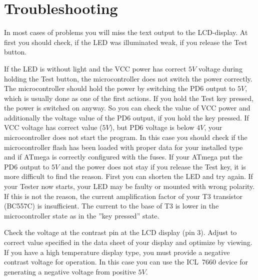 \section{Troubleshooting}
In most cases of problems you will miss the text output to the LCD-display.
At first you should check, if the LED was illuminated weak, if you release
the Test button. 
\begin{description} \setlength{\itemsep}{0em}

\item[Power does not switch on.]
If the LED is without light and the VCC power has correct
\(5V\) voltage during holding the Test button, the microcontroller does not switch the power
correctly. The microcontroller should hold the power by switching the
PD6 output to \(5V\), which is usually done as one of the first actions.
If you hold the Test key pressed, the power is switched on anyway.
So you can check the value of VCC power and additionally the voltage value
of the PD6 output, if you hold the key pressed.
If VCC voltage has correct value (\(5V\)), but PD6 voltage is
below \(4V\), your microcontroller does not start the program. In this case
you should check if the microcontroller flash has been loaded with proper data for your
installed type and if ATmega is correctly configured with the fuses.
If your ATmega put the PD6 output to \(5V\) and the power does not stay if you
release the Test key, it is more difficult to find the reason.
First you can shorten the LED and try again. If your Tester now starts,
your LED may be faulty or mounted with wrong polarity. If this is not
the reason, the current amplification factor of your T3 transistor (BC557C)
is insufficient. The current to the base of T3 is lower in the microcontroller
state as in the ''key pressed'' state.

\item[Nothing is readable on the LCD display]
Check the voltage at the contrast pin at the LCD display (pin 3). Adjust to
correct value specified in the data sheet of your display and optimize by viewing.
If you have a high temperature display type, you must provide a negative contrast voltage
for operation. In this case you can use the ICL~7660 device for generating
a negative voltage from positive \(5V\).


\end{description}

